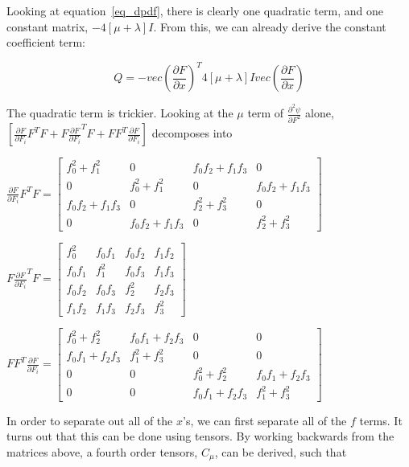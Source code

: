 \documentclass[twocolumn,10pt]{asme2ej}
\begin{document}
Looking at equation~\ref{eq_dpdf}, there is clearly one quadratic term, and one constant matrix, $-4[\mu + \lambda]I$. From this, we can already derive the constant coefficient term:

\begin{equation}
  Q = - vec(\frac{\partial F}{\partial x})^T 4[\mu + \lambda]I vec(\frac{\partial F}{\partial x})
  \label{eq_unreducedConst}
\end{equation}

The quadratic term is trickier. Looking at the $\mu$ term of $\frac{\partial^2 \psi}{\partial F^2}$ alone, $[\frac{\partial F}{\partial F_i}F^TF + F\frac{\partial F}{\partial F_i}^TF + FF^T\frac{\partial F}{\partial F_i}]$ decomposes into

\begin{center}
$\frac{\partial F}{\partial F_i}F^TF = \begin{bmatrix} f_{0}^2 + f_{1}^2 & 0 & f_0f_2 + f_1f_3 & 0 \\
0 & f_{0}^2 + f_{1}^2 & 0 & f_0f_2 + f_1f_3 \\
f_0f_2 + f_1f_3 & 0 & f_{2}^2 + f_{3}^2 & 0 \\
0 & f_0f_2 + f_1f_3 & 0 & f_{2}^2 + f_{3}^2 \end{bmatrix}$

\bigskip
$F\frac{\partial F}{\partial F_i}^TF = \begin{bmatrix} f_{0}^2 & f_0f_1 & f_0f_2 & f_1f_2  \\
f_0f_1 & f_{1}^2 & f_0f_3 & f_1f_3 \\
f_0f_2 & f_0f_3 & f_{2}^2 & f_2f_3 \\
f_1f_2 & f_1f_3 & f_2f_3 & f_{3}^2 \end{bmatrix}$

\bigskip
$FF^T\frac{\partial F}{\partial F_i} = \begin{bmatrix} f_{0}^2 + f_{2}^2 & f_0f_1 + f_2f_3 & 0 & 0  \\
f_0f_1 + f_2f_3 & f_{1}^2 + f_{3}^2 & 0 & 0 \\
0 & 0 & f_{0}^2 + f_{2}^2 & f_0f_1 + f_2f_3 \\
0 & 0 & f_0f_1 + f_2f_3 & f_{1}^2 + f_{3}^2 \end{bmatrix}$
\end{center}

In order to separate out all of the $x$'s, we can first separate all of the $f$ terms. It turns out that this can be done using tensors. By working backwards from the matrices above, a fourth order tensors, $C_{\mu}$, can be derived, such that
\end{document}

